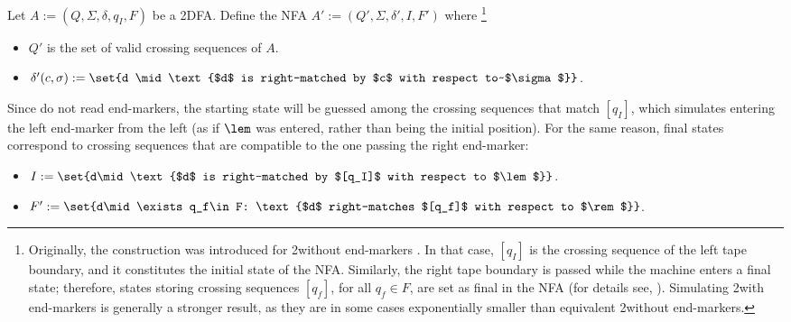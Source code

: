 Let $A:=(Q,\Sigma,\delta,q_I,F)$ be a 2DFA.
Define the NFA $A':=(Q',\Sigma,\delta',I,F')$ where%
\footnote{ %
	Originally, the construction was introduced for 2\DFAs without end-markers \cite{RabSco59}.
	In that case, $[q_I]$ is the crossing sequence of the left tape boundary, and it constitutes the initial state of the NFA.
	Similarly, the right tape boundary is passed while the machine enters a final state; therefore, states storing crossing sequences $[q_f]$, for all $q_f\in F$, are set as final in the NFA (for details see, \eg[,] \cite{HopUll79}).
	Simulating 2\DFAs with end-markers is generally a stronger result, as they are in some cases exponentially smaller than equivalent 2\DFAs without end-markers.
}
\begin{itemize}
	\item $Q'$ is the set of valid crossing sequences of $A$.
	\item $\delta'(c,\sigma):=\set{d \mid \text{$d$ is right-matched by $c$ with respect to~$\sigma$}}$.
\end{itemize}
Since \NFAs do not read end-markers, the starting state will be guessed among the crossing sequences that match $[q_I]$, which simulates entering the left end-marker from the left (as if $\lem$ was entered, rather than being the initial position).
For the same reason, final states correspond to crossing sequences that are compatible to the one passing the right end-marker:
\begin{itemize}
	\item $I:=\set{d\mid \text{$d$ is right-matched by $[q_I]$ with respect to $\lem$}}$.
	\item $F':=\set{d\mid \exists q_f\in F: \text{$d$ right-matches $[q_f]$ with respect to $\rem$}}$.
\end{itemize}

